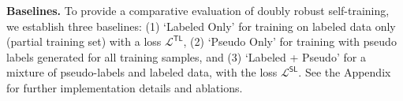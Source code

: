  \textbf{Baselines.} 
To provide a comparative evaluation of doubly robust self-training, we establish three baselines: (1) `Labeled Only' for training on labeled data only (partial training set) with a loss $\mathcal{L}^{\mathsf{TL}}$, (2) `Pseudo Only' for training with pseudo labels generated for all training samples, and (3) `Labeled + Pseudo' for a mixture of pseudo-labels and labeled data, with the loss $\mathcal{L}^{\mathsf{SL}}$. 
See the Appendix for further implementation details and ablations.
% 

